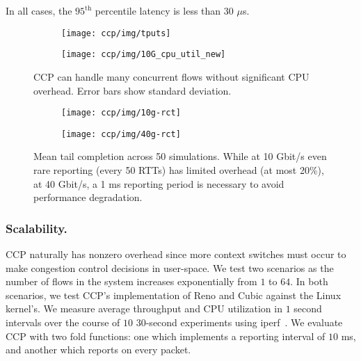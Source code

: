 In all cases, the $95^{\text{th}}$ percentile latency is less than $30$ $\mu$s. 

\begin{figure*}[t]
\centering
    \begin{subfigure}{0.48\textwidth}
        \centering
        \texttt{[image: ccp/img/tputs]}
        \label{fig:eval:perf:numflows}
    \end{subfigure}
    \begin{subfigure}{0.48\textwidth}
        \centering
        \texttt{[image: ccp/img/10G\_cpu\_util\_new]}
        \label{fig:eval:perf:10g}
    \end{subfigure}
    \caption{CCP can handle many concurrent flows without significant CPU overhead. Error bars show standard deviation.}\label{fig:eval:perf}
\end{figure*}

\begin{figure}
    \centering
    \begin{subfigure}{\columnwidth}
    \centering
    \texttt{[image: ccp/img/10g-rct]}
    \label{fig:eval:lowrtt:10g}
    \end{subfigure}
    \begin{subfigure}{\columnwidth}
    \centering
    \texttt{[image: ccp/img/40g-rct]}
    \label{fig:eval:lowrtt:40g}
    \end{subfigure}
    \caption{Mean tail completion across 50 simulations. While at 10 Gbit/s even rare reporting (every 50 RTTs) has limited overhead (at most 20\%), at 40 Gbit/s, a 1 ms reporting period is necessary to avoid performance degradation.}
    \label{fig:eval:lowrtt}
\end{figure}

\subsubsection{Scalability.}
\label{sec:eval:whyfold:scale}

CCP naturally has nonzero overhead since more context switches must occur to make congestion control decisions in user-space.
We test two scenarios as the number of flows in the system increases exponentially from $1$ to $64$.
In both scenarios, we test CCP's implementation of Reno and Cubic against the Linux kernel's. We measure average throughput and CPU utilization in $1$ second intervals over the course of $10$ $30$-second experiments using iperf~\cite{iperf}. We evaluate CCP with two fold functions: one which implements a reporting interval of $10$ ms, and another which reports on every packet.


